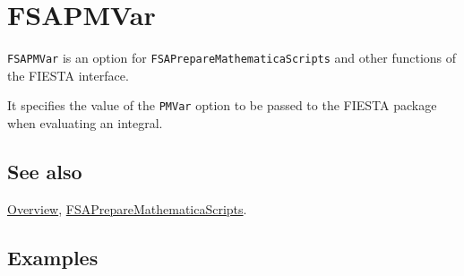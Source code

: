 \documentclass[../FeynHelpersManual.tex]{subfiles}
\begin{document}
\begin{Shaded}
\begin{Highlighting}[]
 
\end{Highlighting}
\end{Shaded}

\hypertarget{fsapmvar}{
\section{FSAPMVar}\label{fsapmvar}}

\texttt{FSAPMVar} is an option for \texttt{FSAPrepareMathematicaScripts}
and other functions of the FIESTA interface.

It specifies the value of the \texttt{PMVar} option to be passed to the
FIESTA package when evaluating an integral.

\subsection{See also}

\hyperlink{toc}{Overview},
\hyperlink{fsapreparemathematicascripts}{FSAPrepareMathematicaScripts}.

\subsection{Examples}
\end{document}
